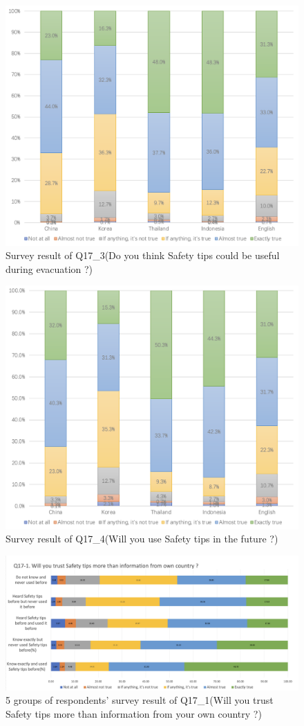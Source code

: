 \begin{figure}[h]
  \includegraphics[width=0.8\linewidth]{Figure/Figure17.jpg}
  \centering
  \caption[Survey result of Q17\_3]{Survey result of Q17\_3(Do you think Safety tips could be useful during evacuation ?)}
  \label{fig17}
\end{figure}

\begin{figure}[h]
  \includegraphics[width=0.8\linewidth]{Figure/Figure18.jpg}
  \centering
  \caption[Survey result of Q17\_4]{Survey result of Q17\_4(Will you use Safety tips in the future ?)}
  \label{fig18}
\end{figure}

\begin{figure}[h]
  \includegraphics[width=0.8\linewidth]{Figure/Figure19.jpg}
  \centering
  \caption[5 groups of respondents' survey result of Q17\_1]{5 groups of respondents' survey result of Q17\_1(Will you trust Safety tips more than information from your own country ?)}
  \label{fig19}
\end{figure}

